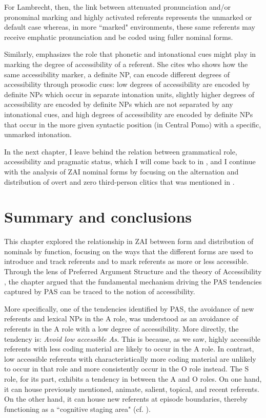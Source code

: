 For Lambrecht, then, the link between attenuated pronunciation and/or pronominal marking and highly activated referents represents the unmarked or default case whereas, in more ``marked" environments, these same referents may receive emphatic pronunciation and be coded using fuller nominal forms.

Similarly, \citet[50]{ariel2001} emphasizes the role that phonetic and intonational cues might play in marking the degree of accessibility of a referent. She cites \citet{mithun1995} who shows how the same accessibility marker, a definite NP, can encode different degrees of accessibility through prosodic cues: low degrees of accessibility are encoded by definite NPs which occur in separate intonation units, slightly higher degrees of accessibility are encoded by definite NPs which are not separated by any intonational cues, and high degrees of accessibility are encoded by definite NPs that occur in the more given syntactic position (in Central Pomo) with a specific, unmarked intonation. 


In the next chapter, I leave behind the relation between grammatical role, accessibility and pragmatic status, which I will come back to in , and I continue with the analysis of ZAI nominal forms by focusing on the alternation and distribution of overt and zero third-person clitics that was mentioned in . 




\section{Summary and conclusions}


This chapter explored the relationship in ZAI between form and distribution of nominals by function, focusing on the ways that the different forms are used to introduce and track referents and to mark referents as more or less accessible. Through the lens of Preferred Argument Structure \citep{dubois2003a} and the theory of Accessibility \citep{ariel2001}, the chapter argued that the fundamental mechanism driving the PAS tendencies captured by PAS can be traced to the notion of accessibility. 

More specifically, one of the tendencies identified by PAS, the avoidance of new referents and lexical NPs in the A role, was understood as an avoidance of referents in the A role with a low degree of accessibility. More directly, the tendency is: \textit{Avoid low accessible As.} This is because, as we saw, highly accessible referents with less coding material are likely to occur in the A role. In contrast, low accessible referents with characteristically more coding material are unlikely to occur in that role and more consistently occur in the O role instead. The S role, for its part, exhibits a tendency in between the A and O roles. On one hand, it can house previously mentioned, animate, salient, topical, and recent referents. On the other hand, it can house new referents at episode boundaries, thereby functioning as a ``cognitive staging area" (cf. ).


